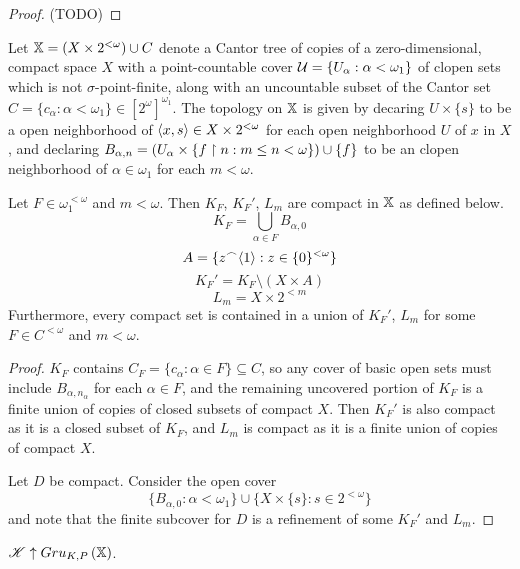 \begin{proof}
  (TODO)
\end{proof}

\begin{defn}
  Let $\mathbb{X}=(X\times 2^{<\omega})\cup C$ denote a Cantor tree
  of copies of a zero-dimensional, compact space $X$ with a point-countable
  cover $\mathcal{U} = \{U_\alpha : \alpha<\omega_1\}$ of
  clopen sets which is not $\sigma$-point-finite, along with an uncountable
  subset of the Cantor set
  $C=\{c_\alpha:\alpha<\omega_1\}\in [2^\omega]^{\omega_1}$.
  The topology on $\mathbb{X}$ is
  given by decaring $U\times\{s\}$ to be a open
  neighborhood of $\langle x,s\rangle\in X\times 2^{<\omega}$ for each
  open neighborhood $U$ of $x$ in $X$, and declaring
  $B_{\alpha,n}=(U_\alpha\times\{f\restriction n: m\leq n<\omega\})\cup\{f\}$ to be
  an clopen neighborhood of $\alpha\in\omega_1$ for each $m<\omega$.
\end{defn}

\begin{lem}
  Let $F\in \omega_1^{<\omega}$ and $m<\omega$.
  Then $K_F$, $K_F'$, $L_m$ are compact in $\mathbb{X}$ as defined below.
  \[
    K_F = \bigcup_{\alpha \in F} B_{\alpha,0}
  \]
  \[
    A = \{z^\frown \langle1\rangle : z \in \{0\}^{<\omega}\}
  \]
  \[
    K_F' = K_F \setminus (X \times A)
  \]
  \[
    L_m = X \times 2^{<m}
  \]
  Furthermore, every compact set is contained in a union of $K_F'$, $L_m$
  for some $F\in C^{<\omega}$ and $m<\omega$.
\end{lem}

\begin{proof}
  $K_F$ contains $C_F=\{c_\alpha: \alpha\in F\}\subseteq C$, so any
  cover of basic open sets must include $B_{\alpha,n_\alpha}$ for each
  $\alpha\in F$, and the remaining uncovered portion of $K_F$ is a finite
  union of copies of closed subsets of compact $X$. Then $K_F'$ is also
  compact as it is a closed subset of $K_F$, and $L_m$ is compact as it
  is a finite union of copies of compact $X$.

  Let $D$ be compact. Consider the open cover
    \[
      \{
        B_{\alpha,0}
      :
        \alpha<\omega_1
      \}
      \cup
      \{
        X\times\{s\}
      :
        s\in 2^{<\omega}
      \}
    \]
  and note that the finite subcover for $D$ is a refinement of some
  $K_F'$ and $L_m$.
\end{proof}

\begin{thm}
  $\mathscr{K}\uparrow Gru_{K,P}\left({\mathbb{X}}\right)$.
\end{thm}

